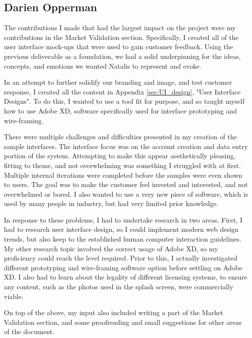 \documentclass[10pt,a4paper]{article}
\begin{document}
\begin{appendices}
\clearpage
\subsection{Darien Opperman}\label{subsec:darienOpperman}
The contributions I made that had the largest impact on the project were my contributions in the Market Validation section. Specifically, I created all of the user interface mock-ups that were used to gain customer feedback. Using the previous deliverable as a foundation, we had a solid underpinning for the ideas, concepts, and emotions we wanted Natalis to represent and evoke. 

In an attempt to further solidify our branding and image, and test customer response, I created all the content in Appendix \ref{sec:UI_design}, "User Interface Designs". To do this, I wanted to use a tool fit for purpose, and so taught myself how to use Adobe XD, software specifically used for interface prototyping and wire-framing. 

There were multiple challenges and difficulties presented in my creation of the sample interfaces. The interface focus was on the account creation and data entry portion of the system. Attempting to make this appear aesthetically pleasing, fitting to theme, and not overwhelming was something I struggled with at first. Multiple internal iterations were completed before the samples were even shown to users. The goal was to make the customer feel invested and interested, and not overwhelmed or bored. I also wanted to use a very new piece of software, which is used by many people in industry, but had very limited prior knowledge.

In response to these problems, I had to undertake research in two areas. First, I had to research user interface design, so I could implement modern web design trends, but also keep to the established human computer interaction guidelines. My other research topic involved the correct usage of Adobe XD, so my proficiency could reach the level required. Prior to this, I actually investigated different prototyping and wire-framing software option before settling on Adobe XD. I also had to learn about the legality of different licensing systems, to ensure any content, such as the photos used in the splash screen, were commercially viable.

On top of the above, my input also included writing a part of the Market Validation section, and some proofreading and small suggestions for other areas of the document.
\end{appendices}
\end{document}
